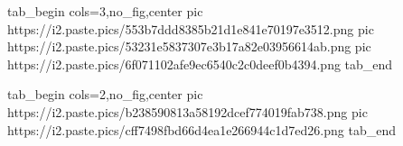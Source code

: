  
 
 
 
 
\zzSecCmtScr

\ifcmt
  tab_begin cols=3,no_fig,center
	     pic https://i2.paste.pics/553b7ddd8385b21d1e841e70197e3512.png
			 pic https://i2.paste.pics/53231e5837307e3b17a82e03956614ab.png
			 pic https://i2.paste.pics/6f071102afe9ec6540c2c0deef0b4394.png
  tab_end
\fi

\ifcmt
  tab_begin cols=2,no_fig,center
		pic https://i2.paste.pics/b238590813a58192dcef774019fab738.png
		pic https://i2.paste.pics/cff7498fbd66d4ea1e266944c1d7ed26.png
  tab_end
\fi
